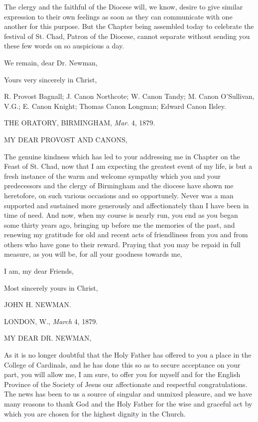 The clergy and the faithful of the Diocese will, we know, desire to
give similar expression to their own feelings as soon as they can
communicate with one another for this purpose. But the Chapter being
assembled today to celebrate the festival of St. Chad, Patron of the Diocese, cannot separate without sending you these few words on so
auspicious a day.

We remain, dear Dr. Newman,

Yours very sincerely in Christ,

R. Provost Bagnall; J. Canon Northcote; W. Canon Tandy;
M. Canon O'Sullivan, V.G.; E. Canon Knight; Thomas Canon Longman;
Edward Canon Ilsley.


THE ORATORY, BIRMINGHAM,
\emph{Mar}. 4, 1879.

MY DEAR PROVOST
AND CANONS,

The genuine kindness which has led to your addressing me in Chapter on
the Feast of St. Chad, now that I am expecting the greatest event of
my life, is but a fresh instance of the warm and welcome sympathy
which you and your predecessors and the clergy of Birmingham and the
diocese have shown me heretofore, on such various occasions and so
opportunely. Never was a man supported and sustained more generously
and affectionately than I have been in time of need. And now, when my
course is nearly run, you end as you began some thirty years ago,
bringing up before me the memories of the past, and renewing my
gratitude for old and recent acts of friendliness from you and
from others who have gone to their reward. Praying that you may be
repaid in full measure, as you will be, for all your goodness towards
me,

I am, my dear Friends,

Most sincerely yours in Christ,

JOHN H. NEWMAN.


LONDON, W., \emph{March} 4, 1879.

MY DEAR DR.
NEWMAN,

As it is no longer doubtful that the Holy Father has offered to you a
place in the College of Cardinals, and he has done this so as to
secure acceptance on your part, you will allow me, I am sure, to offer
you for myself and for the English Province of the Society of Jesus
our affectionate and respectful congratulations. The news has been to
us a source of singular and unmixed pleasure, and we have many reasons
to thank God and the Holy Father for the wise and graceful act by
which you are chosen for the highest dignity in the Church.

